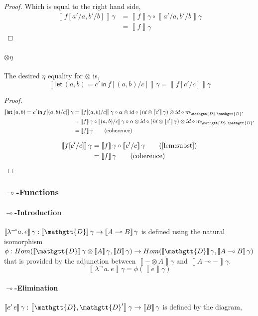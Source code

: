 \documentclass[acmsmall,nonacm]{acmart}
\renewcommand{\Delta}{\mathgtt{D}}
\newcommand{\sem}[1]{\left\llbracket{#1}\right\rrbracket}
\newcommand{\semg}[1]{\sem{#1}\gamma}
\newcommand{\lto}{\multimap}
\newcommand{\letin}[3]{\mathsf{let}\, #1 = #2 \, \mathsf{in}\, #3}
\newcommand{\lamblto}[2]{\lambda^{{\lto}} #1.\, #2}
\newcommand{\applto}[2]{#1 \, #2}
\begin{document}
{\begin{proof}
Which is equal to the right hand side,
\begin{align*}
  \semg{f[a'/a,b'/b]}
  & = \semg{f} \circ \semg{a'/a,b'/b} \\
  & = \semg{f} \tag{coherence}
\end{align*}
\end{proof}

\paragraph{$\otimes\eta$}
The desired $\eta$ equality for $\otimes$ is,
\[
  \semg{\letin {(a,b)} {c'} {f[(a,b)/c]}} = \semg{f[c'/c]}
\]
\begin{proof}
\begin{align*}
  \semg{\letin {(a,b)} {c'} {f[(a,b)/c]}}
  & = \semg{f[(a,b)/c]} \circ \alpha \otimes id \circ (id \otimes \semg{c'}) \otimes id \circ m_{\Delta,\Delta'} \\
  & = \semg{f} \circ \semg{(a,b)/c} \circ \alpha \otimes id \circ (id \otimes \semg{c'}) \otimes id \circ m_{\Delta,\Delta'} \\
  & = \semg{f} \tag{coherence}
\end{align*}

\begin{align*}
  \semg{f[c'/c]}
  &= \semg{f} \circ \semg{c'/c} \tag{\cref{lem:subst}} \\
  &= \semg{f} \tag{coherence}
\end{align*}
\end{proof}


\subsubsection{$\lto$-Functions}
\paragraph{$\lto$-Introduction}
$\semg{\lamblto a e} : \semg{\Delta} \to \semg{A \lto B}$ is defined using the
natural isomorphism
$\phi : Hom(\semg{\Delta} \otimes \semg{A}, \semg{B}) \to Hom(\semg{\Delta}, \semg{A \lto B})$
that is provided by the adjunction between $\semg{- \otimes A}$ and $\semg{A \lto -}$.
\[
\semg{\lamblto a e} = \phi\left( \semg{e} \right)
\]
\paragraph{$\lto$-Elimination}
$\semg{\applto {e'} {e}} : \semg{\Delta,\Delta'} \to \semg{B}$ is defined by the
diagram,

}
\end{document}
